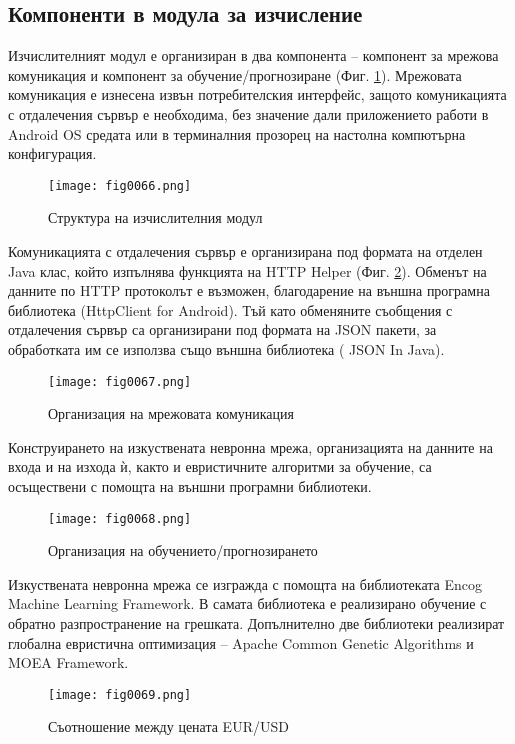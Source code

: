 \subsection{Компоненти в модула за изчисление}

Изчислителният модул е организиран в два компонента – компонент за мрежова комуникация и компонент за обучение/прогнозиране (Фиг. \ref{fig0066}). Мрежовата комуникация е изнесена извън потребителския интерфейс, защото комуникацията с отдалечения сървър е необходима, без значение дали приложението работи в Android OS средата или в терминалния прозорец на настолна компютърна конфигурация. 

\begin{figure}[H]
  \centering
  \texttt{[image: fig0066.png]}
  \caption{Структура на изчислителния модул}
\label{fig0066}
\end{figure}

Комуникацията с отдалечения сървър е организирана под формата на отделен Java клас, който изпълнява функцията на HTTP Helper (Фиг. \ref{fig0067}). Обменът на данните по HTTP протоколът е възможен, благодарение на външна програмна библиотека (HttpClient for Android). Тъй като обменяните съобщения с отдалечения сървър са организирани под формата на JSON пакети, за обработката им се използва също външна библиотека (
JSON In Java).

\begin{figure}[H]
  \centering
  \texttt{[image: fig0067.png]}
  \caption{Организация на мрежовата комуникация}
\label{fig0067}
\end{figure}

Конструирането на изкуствената невронна мрежа, организацията на данните на входа и на изхода ѝ, както и евристичните алгоритми за обучение, са осъществени с помощта на външни програмни библиотеки. 

\begin{figure}[H]
  \centering
  \texttt{[image: fig0068.png]}
  \caption{Организация на обучението/прогнозирането}
\label{fig0068}
\end{figure}

Изкуствената невронна мрежа се изгражда с помощта на библиотеката Encog Machine Learning Framework. В самата библиотека е реализирано обучение с обратно разпространение на грешката. Допълнително две библиотеки реализират глобална евристична оптимизация – Apache Common Genetic Algorithms и MOEA Framework.

\begin{figure}[H]
  \centering
  \texttt{[image: fig0069.png]}
  \caption{Съотношение между цената EUR/USD}
\label{fig0069}
\end{figure}

